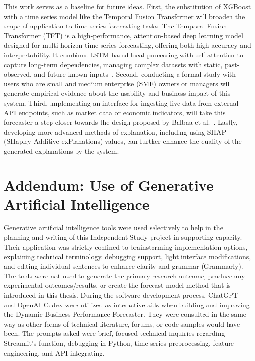 \documentclass[12pt]{article}
\begin{document}
This work serves as a baseline for future ideas. First, the substitution of XGBoost with a time series model like the Temporal Fusion Transformer will broaden the scope of application to time series forecasting tasks. The Temporal Fusion Transformer (TFT) is a high-performance, attention-based deep learning model designed for multi-horizon time series forecasting, offering both high accuracy and interpretability. It combines LSTM-based local processing with self-attention to capture long-term dependencies, managing complex datasets with static, past-observed, and future-known inputs~\cite{fusion_Transformers}. Second, conducting a formal study with users who are small and medium enterprise (SME) owners or managers will generate empirical evidence about the usability and business impact of this system. Third, implementing an interface for ingesting live data from external API endpoints, such as market data or economic indicators, will take this forecaster a step closer towards the design proposed by Balbaa et al.~\cite{inproceedings}. Lastly, developing more advanced methods of explanation, including using SHAP (SHapley Additive exPlanations) values, can further enhance the quality of the generated explanations by the system.

\appendix
\section{Addendum: Use of Generative Artificial Intelligence}
Generative artificial intelligence tools were used selectively to help in the planning and writing of this Independent Study project in supporting capacity. Their application was strictly confined to 
brainstorming implementation options, explaining technical terminology, debugging support, light interface modifications, and editing individual sentences to enhance clarity and grammar (Grammarly). The tools were not used to generate the primary research outcome, produce any experimental outcomes/results, or create the forecast model method that is introduced in this thesis.
During the software development process, ChatGPT and OpenAI Codex were utilized as interactive aids when building and improving the Dynamic Business Performance Forecaster. They were consulted in the same way as other forms of technical literature, forums, or code samples would have been. The prompts asked were brief, focused technical inquiries regarding Streamlit's function, debugging in Python, time series preprocessing, feature engineering, and API integrating.
\end{document}

